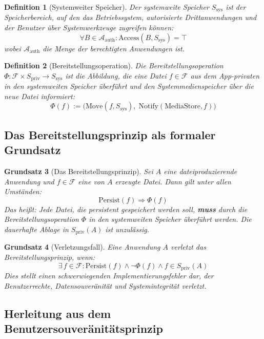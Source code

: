 ﻿\documentclass[12pt, a4paper]{article}
\newtheorem{definition}{Definition}[section]
\newtheorem{prinzip}[definition]{Grundsatz}
\begin{document}
\begin{definition}[Systemweiter Speicher]
\label{def:systemspeicher}
Der \emph{systemweite Speicher} $S_{\text{sys}}$ ist der Speicherbereich, auf den das
Betriebssystem, autorisierte Drittanwendungen und der Benutzer über
Systemwerkzeuge zugreifen können:
\[
  \forall B \in \mathcal{A}_{\text{auth}}: \text{Access}(B, S_{\text{sys}}) = \top
\]
wobei $\mathcal{A}_{\text{auth}}$ die Menge der berechtigten Anwendungen ist.
\end{definition}

\begin{definition}[Bereitstellungsoperation]
\label{def:bereitstellung}
Die \emph{Bereitstellungsoperation} $\Phi: \mathcal{F} \times S_{\text{priv}} \to S_{\text{sys}}$
ist die Abbildung, die eine Datei $f \in \mathcal{F}$ aus dem App-privaten in den
systemweiten Speicher überführt und den Systemmedienspeicher über die neue Datei
informiert:
\[
  \Phi(f) := \big( \text{Move}(f, S_{\text{sys}}),\; \text{Notify}(\text{MediaStore}, f) \big)
\]
\end{definition}

\subsection{Das Bereitstellungsprinzip als formaler Grundsatz}

\begin{prinzip}[Das Bereitstellungsprinzip]
\label{prinzip:bereitstellung}
Sei $A$ eine dateiproduzierende Anwendung und $f \in \mathcal{F}$ eine von $A$ erzeugte
Datei. Dann gilt unter allen Umständen:
\[
  \text{Persist}(f) \Rightarrow \Phi(f)
\]
Das heißt: Jede Datei, die persistent gespeichert werden soll, \textbf{muss} durch die
Bereitstellungsoperation $\Phi$ in den systemweiten Speicher überführt werden.
Die dauerhafte Ablage in $S_{\text{priv}}(A)$ ist unzulässig.
\end{prinzip}

\begin{prinzip}[Verletzungsfall]
\label{prinzip:verletzung}
Eine Anwendung $A$ verletzt das Bereitstellungsprinzip, wenn:
\[
  \exists\, f \in \mathcal{F}: \text{Persist}(f) \wedge \neg\Phi(f) \wedge f \in S_{\text{priv}}(A)
\]
Dies stellt einen schwerwiegenden Implementierungsfehler dar, der Benutzerrechte,
Datensouveränität und Systemintegrität verletzt.
\end{prinzip}

\subsection{Herleitung aus dem Benutzersouveränitätsprinzip}
\end{document}
